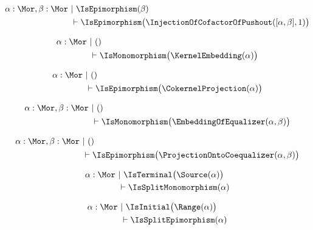 \begin{sequent}
\begin{align*}
  \alpha:\Mor, \beta:\Mor  ~&|~ \IsEpimorphism( \beta ) \\
  &\vdash \IsEpimorphism\big( \InjectionOfCofactorOfPushout( [\alpha, \beta], 1 ) \big)
\end{align*}
\end{sequent}

\begin{sequent}
\begin{align*}
  \alpha:\Mor ~&|~ () \\
  &\vdash \IsMonomorphism\big( \KernelEmbedding( \alpha ) \big)
\end{align*}
\end{sequent}

\begin{sequent}
\begin{align*}
  \alpha:\Mor ~&|~ () \\
  &\vdash \IsEpimorphism\big( \CokernelProjection( \alpha ) \big)
\end{align*}
\end{sequent}

\begin{sequent}
\begin{align*}
  \alpha:\Mor, \beta:\Mor  ~&|~ () \\
  &\vdash \IsMonomorphism\big( \EmbeddingOfEqualizer( \alpha, \beta ) \big)
\end{align*}
\end{sequent}

\begin{sequent}
\begin{align*}
  \alpha:\Mor, \beta:\Mor  ~&|~ () \\
  &\vdash \IsEpimorphism\big( \ProjectionOntoCoequalizer( \alpha, \beta ) \big)
\end{align*}
\end{sequent}

\begin{sequent}\label{sequent:no_proper_context_7}
\begin{align*}
  \alpha:\Mor ~&|~ \IsTerminal\big( \Source( \alpha ) \big)\\
  &\vdash \IsSplitMonomorphism( \alpha )
\end{align*}
\end{sequent}

\begin{sequent}\label{sequent:no_proper_context_8}
\begin{align*}
  \alpha:\Mor ~&|~ \IsInitial\big( \Range( \alpha ) \big)\\
  &\vdash \IsSplitEpimorphism( \alpha )
\end{align*}
\end{sequent}

